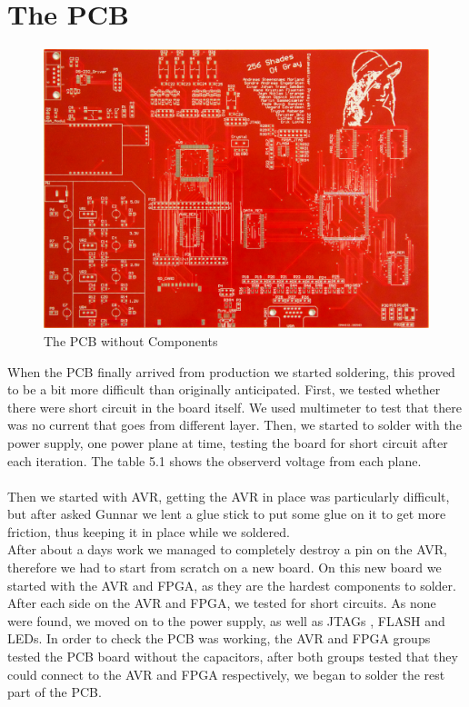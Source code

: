 \section {The PCB}
\begin{figure}[h]
  \centering
  \includegraphics[width=\textwidth]{fig/pcb/pcbwithoutcomp}
  \caption{The PCB without Components}
  \label{fig:pcb}
\end{figure}
When the PCB finally arrived from production we started soldering, this proved to be a bit
more difficult than originally anticipated. First, we tested whether there were short circuit in the board itself. We used multimeter to test that there was no current that goes from different layer. Then, we started to solder with the power supply, one power plane at time, testing the board for short circuit after each iteration. The table 5.1 shows the observerd voltage from each plane. \\
\\
Then we started with AVR, getting the AVR in place was particularly difficult, but after asked Gunnar we lent a glue stick to put some glue on it to get more friction, thus keeping it in place while we soldered.\\
After about a days work we managed to completely destroy a pin on the AVR, therefore we had to start from scratch on a new board. On this new board we started with the AVR and FPGA, as they are the hardest components to solder. After each side on the AVR and FPGA, we tested for short circuits. As none were found, we moved on to the power supply, as well as JTAGs , FLASH and LEDs. In order to check the PCB was working, the AVR and FPGA groups tested the PCB board without the capacitors, after both groups tested that they could connect to the AVR and FPGA respectively, we began to solder the rest part of the PCB.  \\
